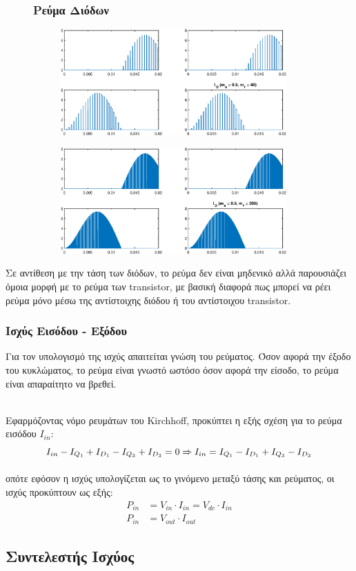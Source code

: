 \begin{figure}[h!]
	\subsubsection*{Ρεύμα Διόδων}
	\begin{subfigure}{0.49\textwidth}
		\centering
		\includegraphics[width=0.95\textwidth]{Images/I_D_40}
	\end{subfigure}
	\begin{subfigure}{0.49\textwidth}
		\centering
		\includegraphics[width=0.95\textwidth]{Images/I_D_200}
	\end{subfigure}
\end{figure}
\noindent
Σε αντίθεση με την τάση των διόδων, το ρεύμα δεν είναι μηδενικό αλλά παρουσιάζει όμοια μορφή με το ρεύμα των transistor, με βασική διαφορά πως μπορεί να ρέει ρεύμα μόνο μέσω της αντίστοιχης διόδου ή του αντίστοιχου transistor.

\subsubsection*{Ισχύς Εισόδου - Εξόδου}
Για τον υπολογισμό της ισχύς απαιτείται γνώση του ρεύματος. Όσον αφορά την έξοδο του κυκλώματος, το ρεύμα είναι γνωστό ωστόσο όσον αφορά την είσοδο, το ρεύμα είναι απαραίτητο να βρεθεί. 

\noindent\\
Εφαρμόζοντας νόμο ρευμάτων του Kirchhoff, προκύπτει η εξής σχέση για το ρεύμα εισόδου $I_{in}$:
\begin{equation}
	I_{in} - I_{Q_1} + I_{D_1} - I_{Q_3} + I_{D_3} = 0 \xRightarrow{} I_{in} = I_{Q_1} - I_{D_1} + I_{Q_3} - I_{D_3} 	
\end{equation}

οπότε εφόσον η ισχύς υπολογίζεται ως το γινόμενο μεταξύ τάσης και ρεύματος, οι ισχύς προκύπτουν ως εξής:
\begin{align}
	P_{in} &= V_{in} \cdot I_{in} = V_{dc} \cdot I_{in}\\
	P_{in} &= V_{out} \cdot I_{out}
\end{align}

\subsection{Συντελεστής Ισχύος}